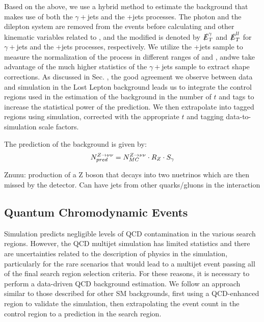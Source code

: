 Based on the above, we use a hybrid method to estimate the \Znunu{} background that makes use of both the $\gamma+$jets and the \Zll+jets processes. The photon and the dilepton system are removed from the events before calculating \met{} and other kinematic variables related to \met, and the modified \met{} is denoted by $\slashed{E}_{T}^\gamma$ and $\slashed{E}_{T}^{ll}$ for $\gamma+$jets and the \Zll+jets processes, respectively. We utilize the \Zll+jets sample to measure the normalization of the \Znunu{} process in different ranges of \nb{} and \nsv, andwe take advantage of the much higher statistics of the $\gamma+$jets sample to extract shape corrections. As discussed in Sec. , the good agreement we observe between data and simulation in the Lost Lepton background leads us to integrate the control regions used in the estimation of the \Znunu{} background in the number of $t$ and \W{} tags to increase the statistical power of the prediction. We then extrapolate into tagged regions using simulation, corrected with the appropriate $t$ and \W{} tagging data-to-simulation scale factors.

The prediction of the \Znunu{} background is given by:
\begin{equation}
N_{pred}^{Z\rightarrow\nu\nu}=N_{MC}^{Z\rightarrow\nu\nu} \cdot R_Z \cdot S_\gamma
\end{equation}

Znunu: production of a Z boson that decays into two nuetrinos which are then missed by the detector. Can have jets from other quarks/gluons in the interaction

\subsection{Quantum Chromodynamic Events}
\label{subsec:QCD}

Simulation predicts negligible levels of QCD contamination in the various search regions. However, the QCD multijet simulation has limited statistics and there are uncertainties related to the description of physics in the simulation, particularly for the rare scenarios that would lead to a multijet event passing all of the final search region selection criteria. For these reasons, it is necessary to perform a data-driven QCD background estimation. We follow an approach similar to those described for other SM backgrounds, first using a QCD-enhanced region to validate the simulation, then extrapolating the event count in the control region to a prediction in the search region. 

